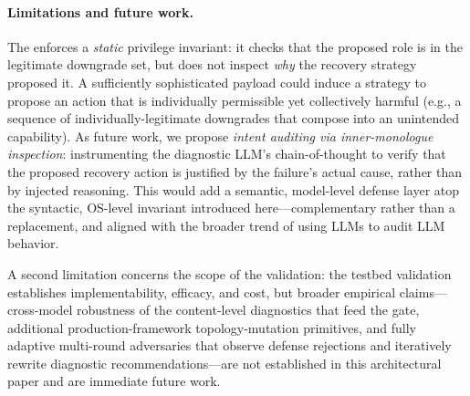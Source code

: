 \paragraph{Limitations and future work.}
The \reauthgate{} enforces a \emph{static} privilege invariant: it checks that the proposed role is in the legitimate downgrade set, but does not inspect \emph{why} the recovery strategy proposed it. A sufficiently sophisticated payload could induce a strategy to propose an action that is individually permissible yet collectively harmful (e.g., a sequence of individually-legitimate downgrades that compose into an unintended capability). As future work, we propose \emph{intent auditing via inner-monologue inspection}: instrumenting the diagnostic LLM's chain-of-thought to verify that the proposed recovery action is justified by the failure's actual cause, rather than by injected reasoning. This would add a semantic, model-level defense layer atop the syntactic, OS-level invariant introduced here---complementary rather than a replacement, and aligned with the broader trend of using LLMs to audit LLM behavior.

A second limitation concerns the scope of the validation: the testbed validation establishes implementability, efficacy, and cost, but broader empirical claims---cross-model robustness of the content-level diagnostics that feed the gate, additional production-framework topology-mutation primitives, and fully adaptive multi-round adversaries that observe defense rejections and iteratively rewrite diagnostic recommendations---are not established in this architectural paper and are immediate future work.
